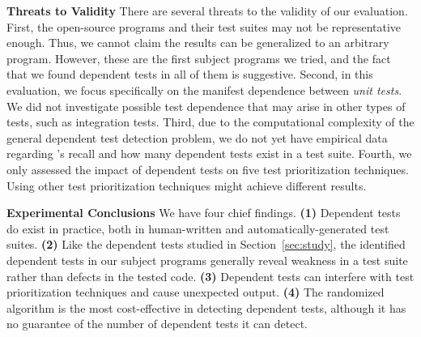 \vspace{1mm}
\noindent \textbf{Threats to Validity}
There are several threats to the validity of our evaluation.
First, the \subjnum open-source
programs and their test suites may not be
representative enough. Thus, we cannot claim the results
can be generalized to an arbitrary program.
However, these are the first \subjnum subject programs
we tried, and the fact that we found dependent tests
in all of them is suggestive.
Second, in this evaluation, we focus specifically on
the {manifest dependence} between \textit{unit tests}.
We did not investigate possible test dependence that may arise
in other types of tests, such as integration tests.
Third, due to the computational complexity of the general dependent test
detection problem, we do not yet have
empirical data regarding \ourtool's recall and how many dependent
tests exist in a test suite. 
Fourth, we only assessed the
impact of dependent tests on five test prioritization
techniques.
Using other test prioritization techniques
might achieve different results. 


\vspace{1mm}

\noindent \textbf{Experimental Conclusions}
We have four chief findings. \textbf{(1)}
Dependent tests do exist in practice, both in
human-written and automatically-generated test suites.
\textbf{(2)} Like the dependent tests
studied in Section~\ref{sec:study}, the identified
dependent tests in our subject programs generally reveal weakness
in a test suite rather than defects in the tested code.
\textbf{(3)} Dependent tests can interfere with
test prioritization techniques and cause unexpected output.
\textbf{(4)} 
The randomized algorithm is the most cost-effective in
detecting dependent tests, although it has no guarantee
of the number of dependent tests it can detect.



